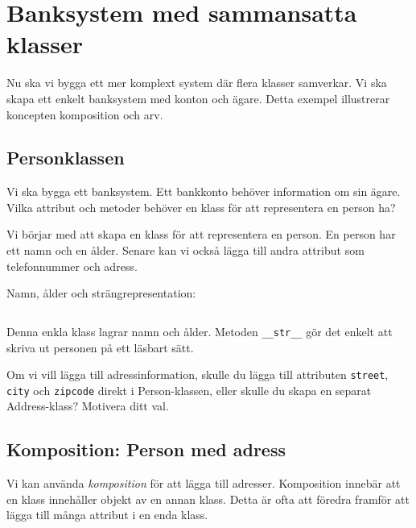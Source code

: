 \section{Banksystem med sammansatta klasser}

Nu ska vi bygga ett mer komplext system där flera klasser samverkar. 
Vi ska skapa ett enkelt banksystem med konton och ägare. Detta exempel 
illustrerar koncepten komposition och arv.

\subsection{Personklassen}

\begin{exercise}
  Vi ska bygga ett banksystem. Ett bankkonto behöver information om sin 
  ägare. Vilka attribut och metoder behöver en klass för att representera 
  en person ha?
\end{exercise}

Vi börjar med att skapa en klass för att representera en person. En person 
har ett namn och en ålder. Senare kan vi också lägga till andra attribut som 
telefonnummer och adress.

\begin{frame}[fragile]
  \begin{example}
    Namn, ålder och strängrepresentation:
    \inputminted[linenos,firstline=3,lastline=10]{python}{examples/bank.py}
  \end{example}
\end{frame}

Denna enkla klass lagrar namn och ålder. Metoden \texttt{__str__} 
gör det enkelt att skriva ut personen på ett läsbart sätt.

\begin{exercise}
  Om vi vill lägga till adressinformation, skulle du lägga till attributen 
  \texttt{street}, \texttt{city} och 
  \texttt{zipcode} direkt i Person-klassen, eller skulle du skapa 
  en separat Address-klass? Motivera ditt val.
\end{exercise}

\subsection{Komposition: Person med adress}

Vi kan använda \emph{komposition} för att lägga till adresser. Komposition 
innebär att en klass innehåller objekt av en annan klass. Detta är ofta att 
föredra framför att lägga till många attribut i en enda klass.

